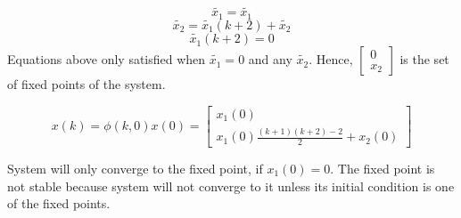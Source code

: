 \documentclass[12pt,a4paper, margin=1in]{article}
\newcommand\ddfrac[2]{\frac{\displaystyle #1}{\displaystyle #2}}
\begin{document}
\begin{enumerate}
\begin{enumerate}
                \begin{equation*}
                    \tilde{x_1} = \tilde{x_1}
                \end{equation*}
                \begin{equation*}
                    \tilde{x_2} = \tilde{x_1}(k+2) + \tilde{x_2}
                \end{equation*}
                \begin{equation*}
                    \tilde{x_1}(k+2) = 0
                \end{equation*}
                Equations above only satisfied when $\tilde{x_1} = 0$ and any $\tilde{x_2}$. Hence, $\begin{bmatrix}
                    0 \\ x_2
                \end{bmatrix}$ is the set of fixed points of the system.

                \bigskip

                \begin{equation*}
                    x(k) = \phi(k, 0)x(0) = \begin{bmatrix}
                        x_1(0) \\ x_1(0)\ddfrac{(k+1)(k+2)-2}{2} + x_2(0)
                    \end{bmatrix}
                \end{equation*}

                System will only converge to the fixed point, if $x_1(0) = 0$. 
                The fixed point is not stable because system will not converge to it unless 
                its initial condition is one of the fixed points. 
        \end{enumerate}

\end{enumerate}
\end{document}
